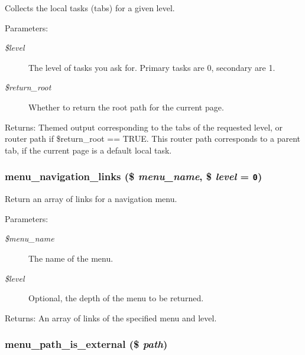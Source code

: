 Collects the local tasks (tabs) for a given level.

\begin{Desc}
\item[Parameters:]
\begin{description}
\item[{\em \$level}]The level of tasks you ask for. Primary tasks are 0, secondary are 1. \item[{\em \$return\_\-root}]Whether to return the root path for the current page. \end{description}
\end{Desc}
\begin{Desc}
\item[Returns:]Themed output corresponding to the tabs of the requested level, or router path if \$return\_\-root == TRUE. This router path corresponds to a parent tab, if the current page is a default local task. \end{Desc}
\hypertarget{group__menu_gb4cdacc813ae9e06271aa4aa2d9495a7}{
\subsubsection[{menu\_\-navigation\_\-links}]{\setlength{\rightskip}{0pt plus 5cm}menu\_\-navigation\_\-links (\$ {\em menu\_\-name}, \/  \$ {\em level} = {\tt 0})}}
\label{group__menu_gb4cdacc813ae9e06271aa4aa2d9495a7}


Return an array of links for a navigation menu.

\begin{Desc}
\item[Parameters:]
\begin{description}
\item[{\em \$menu\_\-name}]The name of the menu. \item[{\em \$level}]Optional, the depth of the menu to be returned. \end{description}
\end{Desc}
\begin{Desc}
\item[Returns:]An array of links of the specified menu and level. \end{Desc}
\hypertarget{group__menu_gd025fe7dfd80513f2f7baaa66519c508}{
\subsubsection[{menu\_\-path\_\-is\_\-external}]{\setlength{\rightskip}{0pt plus 5cm}menu\_\-path\_\-is\_\-external (\$ {\em path})}}
\label{group__menu_gd025fe7dfd80513f2f7baaa66519c508}


